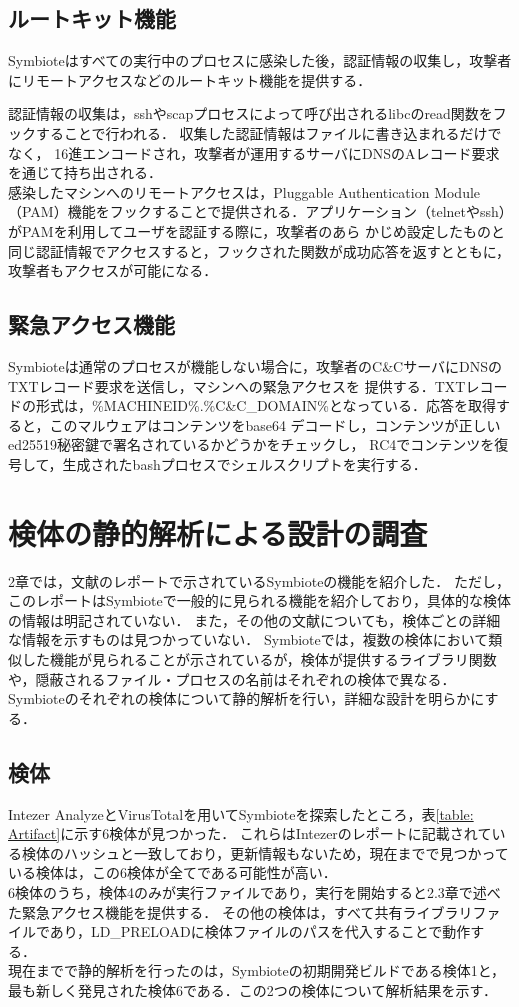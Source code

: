 \documentclass[submit,techreq,noauthor]{eco}	%
\begin{document}
\subsection{ルートキット機能}
Symbioteはすべての実行中のプロセスに感染した後，認証情報の収集し，攻撃者にリモートアクセスなどのルートキット機能を提供する．

認証情報の収集は，sshやscapプロセスによって呼び出されるlibcのread関数をフックすることで行われる．
収集した認証情報はファイルに書き込まれるだけでなく，
16進エンコードされ，攻撃者が運用するサーバにDNSのAレコード要求を通じて持ち出される．\\
\indent
感染したマシンへのリモートアクセスは，Pluggable Authentication
Module（PAM）機能をフックすることで提供される．アプリケーション（telnetやssh）がPAMを利用してユーザを認証する際に，攻撃者のあら
かじめ設定したものと同じ認証情報でアクセスすると，フックされた関数が成功応答を返すとともに，攻撃者もアクセスが可能になる．

\subsection{緊急アクセス機能}
Symbioteは通常のプロセスが機能しない場合に，攻撃者のC\&CサーバにDNSのTXTレコード要求を送信し，マシンへの緊急アクセスを
提供する．TXTレコードの形式は，\%MACHINEID\%.\%C\&C\_DOMAIN\%となっている．応答を取得すると，このマルウェアはコンテンツをbase64
デコードし，コンテンツが正しいed25519秘密鍵で署名されているかどうかをチェックし，
RC4でコンテンツを復号して，生成されたbashプロセスでシェルスクリプトを実行する．\\


\section{検体の静的解析による設計の調査}
2章では，文献\cite{Symbiote}のレポートで示されているSymbioteの機能を紹介した．
ただし，このレポートはSymbioteで一般的に見られる機能を紹介しており，具体的な検体の情報は明記されていない．
また，その他の文献についても，検体ごとの詳細な情報を示すものは見つかっていない．
\indent
Symbioteでは，複数の検体において類似した機能が見られることが示されているが，検体が提供するライブラリ関数や，隠蔽されるファイル・プロセスの名前はそれぞれの検体で異なる．
Symbioteのそれぞれの検体について静的解析を行い，詳細な設計を明らかにする．

\subsection{検体}
Intezer AnalyzeとVirusTotalを用いてSymbioteを探索したところ，表\ref{table: Artifact}に示す6検体が見つかった．
これらはIntezerのレポートに記載されている検体のハッシュと一致しており，更新情報もないため，現在までで見つかっている検体は，この6検体が全てである可能性が高い．\\
\indent
6検体のうち，検体4のみが実行ファイルであり，実行を開始すると2.3章で述べた緊急アクセス機能を提供する．
その他の検体は，すべて共有ライブラリファイルであり，LD\_PRELOADに検体ファイルのパスを代入することで動作する．\\
\indent
現在までで静的解析を行ったのは，Symbioteの初期開発ビルドである検体1と，最も新しく発見された検体6である．この2つの検体について解析結果を示す．
\end{document}

